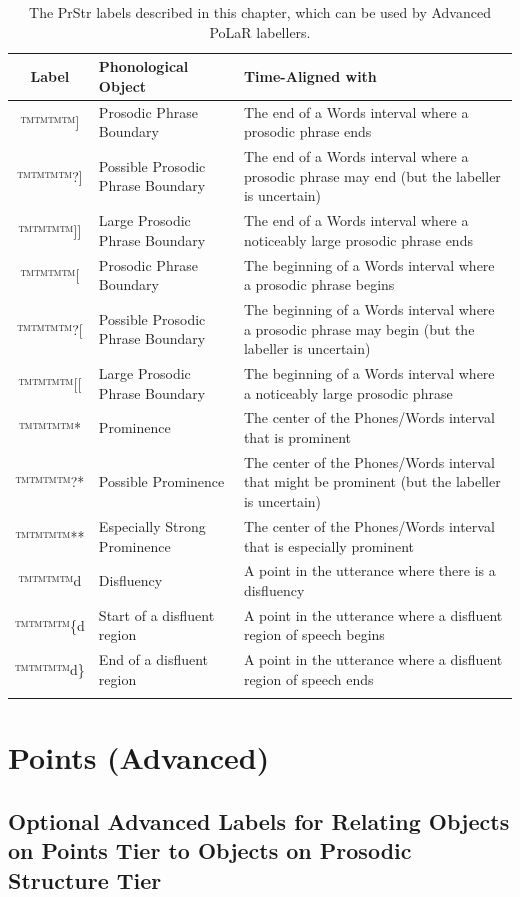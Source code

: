 \documentclass[11pt, twoside]{memoir}
\begin{document}
\begin{longtable}{cp{.3\linewidth}p{.45\linewidth}}
	\toprule
	\textbf{Label} & \textbf{Phonological Object} & \textbf{Time-Aligned with} \tabularnewline
	\midrule
	\endhead
	\rowcolor{green}
	™™™™{]} & Prosodic Phrase Boundary & The end of a Words interval where a prosodic phrase ends \tabularnewline
	™™™™{?]} & Possible Prosodic Phrase Boundary & The end of a Words interval where a prosodic phrase may end (but the labeller is uncertain) \tabularnewline
	™™™™{]]} & Large Prosodic Phrase Boundary & The end of a Words interval where a noticeably large prosodic phrase ends \tabularnewline
	™™™™{[} & Prosodic Phrase Boundary & The beginning of a Words interval where a prosodic phrase begins \tabularnewline
	™™™™{?[} & Possible Prosodic Phrase Boundary & The beginning of a Words interval where a prosodic phrase may begin (but the labeller is uncertain) \tabularnewline
	™™™™{[[} & Large Prosodic Phrase Boundary & The beginning of a Words interval where a noticeably large prosodic phrase \tabularnewline
	\hline
	\rowcolor{green}
	™™™™{*} & Prominence & The center of the Phones/Words interval that is prominent\tabularnewline
	™™™™{?*} & Possible Prominence & The center of the Phones/Words interval that might be prominent (but the labeller is uncertain) \tabularnewline
	™™™™{**} & Especially Strong Prominence & The center of the Phones/Words interval that is especially prominent \tabularnewline
	\hline
	™™™™{d} & Disfluency & A point in the utterance where there is a disfluency\tabularnewline
	™™™™{\{d} & Start of a disfluent region & A point in the utterance where a disfluent region of speech begins\tabularnewline
	™™™™{d\}} & End of a disfluent region & A point in the utterance where a disfluent region of speech ends\tabularnewline
	\bottomrule
	\caption{The PrStr labels described in this chapter, which can be used by Advanced PoLaR labellers.}
\end{longtable}


\section{Points (Advanced)}\label{sec:points-advanced}

\subsection{Optional Advanced Labels for Relating Objects on Points Tier to Objects on Prosodic Structure Tier}\label{sec:optional-advanced-labels-for-relating-points-tier-objects-to-prosodic-structure-tier-objects}
\end{document}

